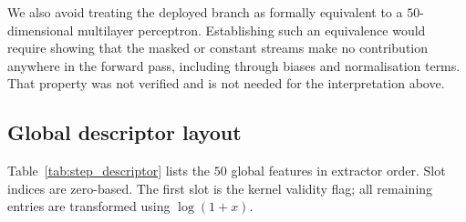 \documentclass[preprint,12pt]{elsarticle}
\begin{document}
We also avoid treating the deployed branch as formally equivalent to a
$50$-dimensional multilayer perceptron. Establishing such an equivalence would require
showing that the masked or constant streams make no contribution anywhere in the forward
pass, including through biases and normalisation terms. That property was not verified and
is not needed for the interpretation above.

\subsection{Global descriptor layout}
\label{app:step_layout}

Table~\ref{tab:step_descriptor} lists the $50$ global features in extractor order. Slot
indices are zero-based. The first slot is the kernel validity flag; all remaining entries
are transformed using $\log(1+x)$.
\end{document}
